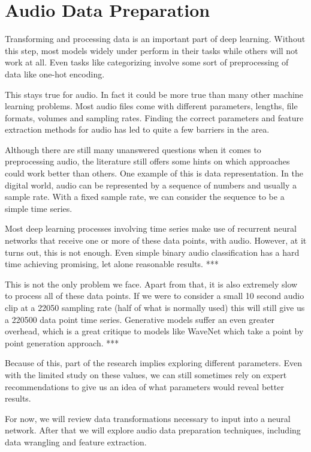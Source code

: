 \documentclass{book}
\begin{document}
\chapter{Audio Data Preparation}
\qquad Transforming and processing data is an important part of deep learning.
Without this step, most models widely under perform in their tasks while others will not work at all.
Even tasks like categorizing involve some sort of preprocessing of data like one-hot encoding.
\par
This stays true for audio.
In fact it could be more true than many other machine learning problems.
Most audio files come with different parameters, lengths, file formats, volumes and sampling rates.
Finding the correct parameters and feature extraction methods for audio has led to quite a few barriers in the area.
\par
Although there are still many unanswered questions when it comes to preprocessing audio, the literature still offers some hints on which approaches could work better than others.
One example of this is data representation.
In the digital world, audio can be represented by a sequence of numbers and usually a sample rate.
With a fixed sample rate, we can consider the sequence to be a simple time series.
\par
Most deep learning processes involving time series make use of recurrent neural networks that receive one or more of these data points, with audio.
However, at it turns out, this is not enough.
Even simple binary audio classification has a hard time achieving promising, let alone reasonable results. *** %
\par
This is not the only problem we face. Apart from that, it is also extremely slow to process all of these data points.
If we were to consider a small 10 second audio clip at a 22050 sampling rate (half of what is normally used) this will still give us a 220500 data point time series.
Generative models suffer an even greater overhead, which is a great critique to models like WaveNet which take a point by point generation approach. *** %
\par
Because of this, part of the research implies exploring different parameters.
Even with the limited study on these values, we can still sometimes rely on expert recommendations to give us an idea of what parameters would reveal better results.
\par
For now, we will review data transformations necessary to input into a neural network.
After that we will explore audio data preparation techniques, including data wrangling and feature extraction.
\end{document}

